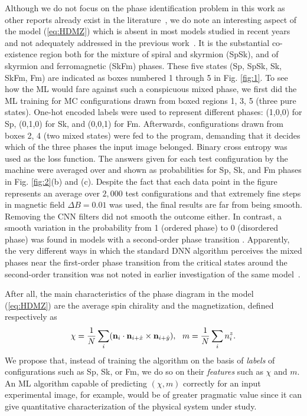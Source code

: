 \documentclass[reprint,amsmath,amssymb,aps,showpacs,superscriptaddress,prl]{revtex4-1}
\newcommand{\ba}{\begin{eqnarray}}
\newcommand{\ea}{\end{eqnarray}}
\renewcommand{\v}[1]{{\bf #1}}
\begin{document}
Although we do not focus on the phase identification problem in this work as other reports already exist in the literature~\cite{russian18}, we do note an interesting aspect of the model (\ref{eq:HDMZ}) which is absent in most models studied in recent years and not adequately addressed in the previous work~\cite{russian18}. It is the substantial co-existence region both for the mixture of spiral and skyrmion (SpSk), and of skyrmion and ferromagnetic (SkFm) phases. These five states (Sp, SpSk, Sk, SkFm, Fm) are indicated as boxes numbered 1 through 5 in Fig. \ref{fig:1}. To see how the ML would fare against such a conspicuous mixed phase, we first did the ML training for MC configurations drawn from boxed regions 1, 3, 5 (three pure states). One-hot encoded labels were used to represent different phases: (1,0,0) for Sp, (0,1,0) for Sk, and (0,0,1) for Fm. Afterwards, configurations drawn from boxes 2, 4 (two mixed states) were fed to the program, demanding that it decides which of the three phases the input image belonged. Binary cross entropy was used as the loss function. The answers given for each test configuration by the machine were averaged over and shown as probabilities for Sp, Sk, and Fm phases  in Fig. \ref{fig:2}(b) and (c). Despite the fact that each data point in the figure represents an average over $2,000$ test configurations and that extremely fine steps in magnetic field $\Delta B= 0.01$ was used, the final results are far from being smooth. Removing the CNN filters did not smooth the outcome either. In contrast, a smooth variation in the probability from 1 (ordered phase) to 0 (disordered phase) was found in models with a second-order phase transition \cite{wang16,melko17,tanaka17,scalettar17,wetzel17,kim18,zhai17,scalettar17,beach18}.
Apparently, the very different ways in which the standard DNN algorithm perceives the mixed phases near the first-order phase transition from the critical states around the second-order transition was not noted in earlier investigation of the same model~\cite{russian18}. 

After all, the main characteristics of the phase diagram in the model (\ref{eq:HDMZ}) are the average spin chirality and the magnetization, defined respectively as
%
\ba
\chi = {1\over N} \sum_i  ( \v n_i \cdot \v n_{i+\hat{x}} \times \v n_{i+\hat{y}} ) ,  ~~
m = {1\over N} \sum_i n_i^z .  \label{eq:m-and-chi} \ea
%
We propose that, instead of training the algorithm on the basis of {\it labels} of configurations such as Sp, Sk, or Fm, we do so on their {\it features} such as $\chi$ and $m$. An ML algorithm capable of predicting $(\chi, m)$ correctly for an input experimental image, for example, would be of greater pragmatic value since it can give quantitative characterization of the physical system under study.
\end{document}
